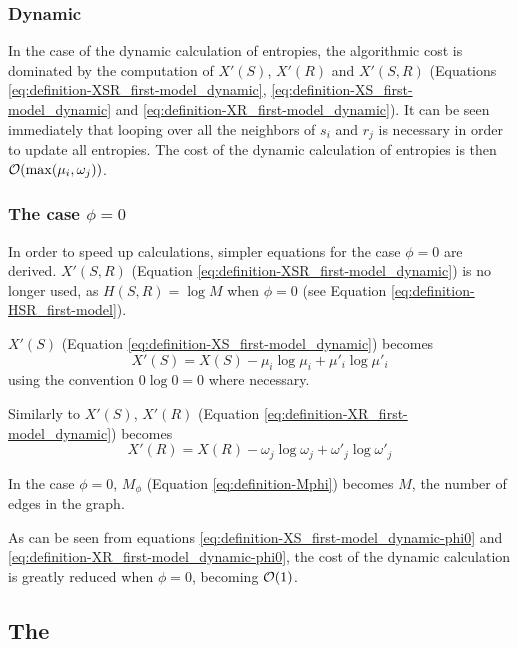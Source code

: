 \subsubsection{Dynamic}

In the case of the dynamic calculation of entropies, the algorithmic cost is dominated by the computation of $X'(S)$, $X'(R)$ and $X'(S,R)$ (Equations \eqref{eq:definition-XSR_first-model_dynamic}, \eqref{eq:definition-XS_first-model_dynamic} and \eqref{eq:definition-XR_first-model_dynamic}).
It can be seen immediately that looping over all the neighbors of $s_i$ and $r_j$ is necessary in order to update all entropies.
The cost of the dynamic calculation of entropies is then $\mathcal{O}(\max(\mu_i,\omega_j))$.

\subsubsection{The case $\phi=0$}

In order to speed up calculations, simpler equations for the case $\phi=0$ are derived.
$X'(S,R)$ (Equation \eqref{eq:definition-XSR_first-model_dynamic}) is no longer used, as $H(S,R) = \log M$ when $\phi=0$ (see Equation \eqref{eq:definition-HSR_first-model}).

$X'(S)$ (Equation \eqref{eq:definition-XS_first-model_dynamic}) becomes
\begin{equation}
  \label{eq:definition-XS_first-model_dynamic-phi0}
  X'(S) = X(S) - \mu_i \log \mu_i + \mu'_i \log \mu'_i
\end{equation}
using the convention $0 \log 0 = 0$ where necessary.

Similarly to $X'(S)$, $X'(R)$ (Equation \eqref{eq:definition-XR_first-model_dynamic}) becomes
\begin{equation}
  \label{eq:definition-XR_first-model_dynamic-phi0}
  X'(R) = X(R) - \omega_j \log \omega_j + \omega'_j \log \omega'_j
\end{equation}

In the case $\phi=0$, $M_\phi$ (Equation \eqref{eq:definition-Mphi}) becomes $M$, the number of edges in the graph.

As can be seen from equations \eqref{eq:definition-XS_first-model_dynamic-phi0} and \eqref{eq:definition-XR_first-model_dynamic-phi0}, the cost of the dynamic calculation is greatly reduced when $\phi=0$, becoming $\mathcal{O}(1)$.

\subsection{The \secondmodel{}}
\label{sec:model_compute_second-model}

